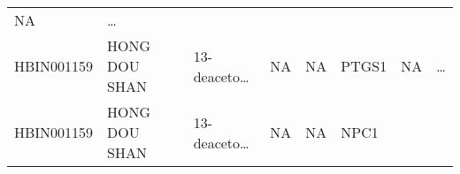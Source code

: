 \documentclass[
]{article}
\begin{document}
\begin{longtable}[]{@{}llllllll@{}}
\begin{minipage}[t]{0.11\columnwidth}
NA\strut
\end{minipage} & \begin{minipage}[t]{0.03\columnwidth}\raggedright
\ldots{}\strut
\end{minipage}\tabularnewline
\begin{minipage}[t]{0.11\columnwidth}\raggedright
HBIN001159\strut
\end{minipage} & \begin{minipage}[t]{0.11\columnwidth}\raggedright
HONG DOU SHAN\strut
\end{minipage} & \begin{minipage}[t]{0.14\columnwidth}\raggedright
13-deaceto\ldots{}\strut
\end{minipage} & \begin{minipage}[t]{0.14\columnwidth}\raggedright
NA\strut
\end{minipage} & \begin{minipage}[t]{0.08\columnwidth}\raggedright
NA\strut
\end{minipage} & \begin{minipage}[t]{0.09\columnwidth}\raggedright
PTGS1\strut
\end{minipage} & \begin{minipage}[t]{0.11\columnwidth}\raggedright
NA\strut
\end{minipage} & \begin{minipage}[t]{0.03\columnwidth}\raggedright
\ldots{}\strut
\end{minipage}\tabularnewline
\begin{minipage}[t]{0.11\columnwidth}\raggedright
HBIN001159\strut
\end{minipage} & \begin{minipage}[t]{0.11\columnwidth}\raggedright
HONG DOU SHAN\strut
\end{minipage} & \begin{minipage}[t]{0.14\columnwidth}\raggedright
13-deaceto\ldots{}\strut
\end{minipage} & \begin{minipage}[t]{0.14\columnwidth}\raggedright
NA\strut
\end{minipage} & \begin{minipage}[t]{0.08\columnwidth}\raggedright
NA\strut
\end{minipage} & \begin{minipage}[t]{0.09\columnwidth}\raggedright
NPC1\strut
\end{minipage} & \begin{minipage}[t]{0.11\columnwidth}\raggedright

\end{minipage}
\end{longtable}
\end{document}

